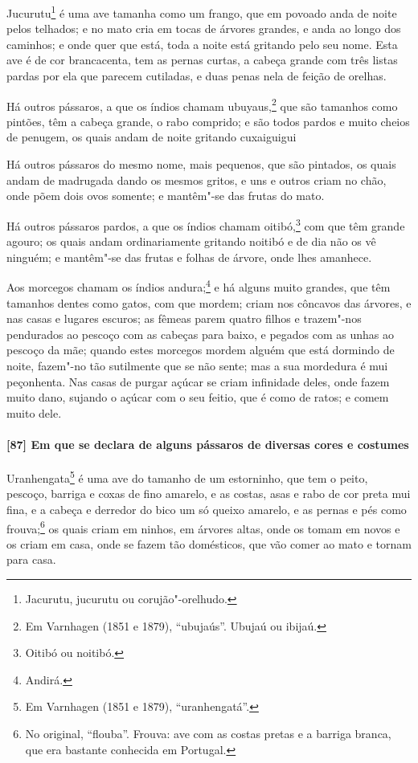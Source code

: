 Jucurutu\footnote{ Jacurutu, jucurutu ou corujão"-orelhudo.} é uma ave tamanha como um
frango, que em povoado anda de noite pelos telhados; e no mato cria em tocas de árvores
grandes, e anda ao longo dos caminhos; e onde quer que está, toda a noite está gritando
pelo seu nome. Esta ave é de cor brancacenta, tem as pernas curtas, a cabeça grande com
três listas pardas por ela que parecem cutiladas, e duas penas nela de feição de orelhas.

Há outros pássaros, a que os índios chamam ubuyaus,\footnote{ Em Varnhagen (1851 e 1879),
``ubujaús''. Ubujaú ou ibijaú.} que são tamanhos como pintões, têm a cabeça grande, o
rabo comprido; e são todos pardos e muito cheios de penugem, os quais andam de noite
gritando cuxaiguigui

Há outros pássaros do mesmo nome, mais pequenos, que são pintados, os quais andam de
madrugada dando os mesmos gritos, e uns e outros criam no chão, onde põem dois ovos
somente; e mantêm"-se das frutas do mato.

Há outros pássaros pardos, a que os índios chamam oitibó,\footnote{ Oitibó ou noitibó.}
com que têm grande agouro; os quais andam ordinariamente gritando noitibó e de dia não os
vê ninguém; e mantêm"-se das frutas e folhas de árvore, onde lhes amanhece.

Aos morcegos chamam os índios andura;\footnote{ Andirá.} e há alguns muito grandes, que
têm tamanhos dentes como gatos, com que mordem; criam nos côncavos das árvores, e nas
casas e lugares escuros; as fêmeas parem quatro filhos e trazem"-nos pendurados ao pescoço
com as cabeças para baixo, e pegados com as unhas ao pescoço da mãe; quando estes morcegos
mordem alguém que está dormindo de noite, fazem"-no tão sutilmente que se não sente; mas a
sua mordedura é mui peçonhenta. Nas casas de purgar açúcar se criam infinidade deles, onde
fazem muito dano, sujando o açúcar com o seu feitio, que é como de ratos; e comem muito
dele.

\paragraph{[87] Em que se declara de alguns pássaros de diversas cores e costumes}\quad
Uranhengata\footnote{ Em Varnhagen (1851 e 1879), ``uranhengatá''.} é uma ave do tamanho
de um estorninho, que tem o peito, pescoço, barriga e coxas de fino amarelo, e as costas,
asas e rabo de cor preta mui fina, e a cabeça e derredor do bico um só queixo amarelo, e
as pernas e pés como frouva;\footnote{ No original, ``flouba''. Frouva: ave com as costas
pretas e a barriga branca, que era bastante conhecida em Portugal.} os quais criam em
ninhos, em árvores altas, onde os tomam em novos e os criam em casa, onde se fazem tão
domésticos, que vão comer ao mato e tornam para casa.

